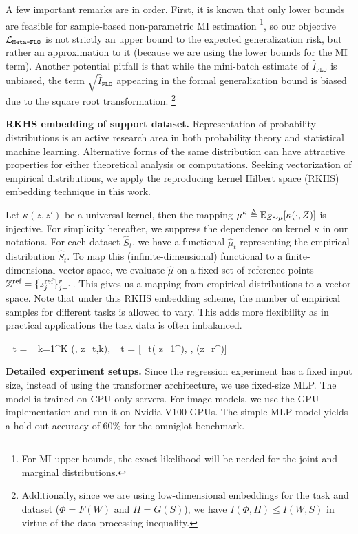 \documentclass[nohyperref]{article}
\theoremstyle{plain}
\theoremstyle{definition}
\theoremstyle{remark}
\newcommand{\FLO}{\texttt{FLO}}
\newcommand{\metaflo}{\texttt{Meta-FLO} }
\begin{document}
A few important remarks are in order. First, it is known that only lower bounds are feasible for sample-based non-parametric MI estimation \footnote{For MI upper bounds, the exact likelihood will be needed for the joint and marginal distributions.}, so our objective $\CL_{\metaflo}$ is not strictly an upper bound to the expected generalization risk, but rather an approximation to it (because we are using the lower bounds for the MI term). Another potential pitfall is that while the mini-batch estimate of $\hat{I}_{\FLO}$ is unbiased, the term $\sqrt{\hat{I}_{\FLO}}$ appearing in the formal generalization bound is biased due to the square root transformation. \footnote{Additionally, since we are using low-dimensional embeddings for the task and dataset ($\Phi = F(W)$ and $H=G(S)$), we have $I(\Phi, H)\leq I(W,S)$ in virtue of the data processing inequality.}
% 


{\bf RKHS embedding of support dataset.} Representation of probability distributions is an active research area in both probability theory and statistical machine learning. Alternative forms of the same distribution can have attractive properties for either theoretical analysis or computations. Seeking vectorization of empirical distributions, we apply the reproducing kernel Hilbert space (RKHS) embedding technique in this work. 

Let $\kappa(z, z')$ be a universal kernel, then the mapping $\mu^{\kappa} \triangleq \mathbb{E}_{Z\sim \mu}[\kappa(\cdot, Z)]$ is injective. For simplicity hereafter, we suppress the dependence on kernel $\kappa$ in our notations. For each dataset $\hat{S}_t$, we have a functional $\hat{\mu}_t$ representing the empirical distribution $\hat{S}_t$. To map this (infinite-dimensional) functional to a finite-dimensional vector space, we evaluate $\hat{\mu}$ on a fixed set of reference points $\mathbb{Z}^{\text{ref}} = \{ z_{j}^{\text{ref}} \}_{j=1}^r$. This gives us a mapping from empirical distributions to a vector space. Note that under this RKHS embedding scheme, the number of empirical samples for different tasks is allowed to vary. This adds more flexibility as in practical applications the task data is often imbalanced. 

\beq
\hat{\mu}_t =  \sum_{k=1}^K \kappa(\cdot, z_{t,k}), _t = [\hat{\mu}_t( z_{1}^{}), \cdots,  \hat{\mu}(z_{r}^{})]
\eeq


{\bf Detailed experiment setups.} Since the regression experiment has a fixed input size, instead of using the transformer architecture, we use fixed-size MLP. The model is trained on CPU-only servers. For image models, we use the GPU implementation and run it on Nvidia V100 GPUs. The simple MLP model yields a hold-out accuracy of $60\%$ for the omniglot benchmark. 
\end{document}
